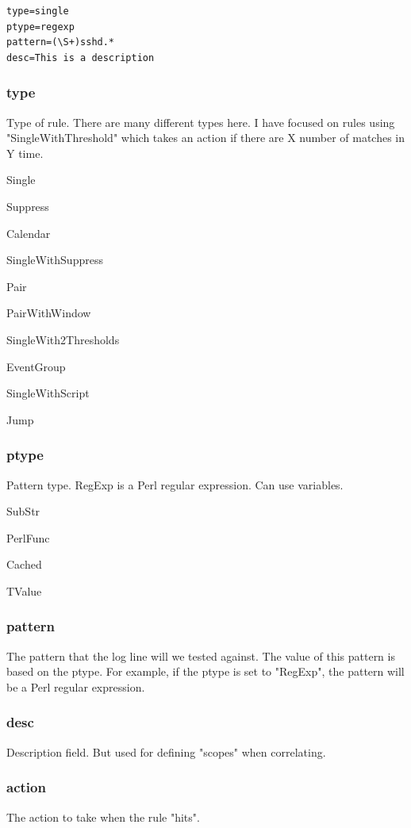 \begin{lstlisting}
type=single
ptype=regexp
pattern=(\S+)sshd.*
desc=This is a description
\end{lstlisting}

\subsubsection{type}
Type of rule. There are many different types here.
I have focused on rules using "SingleWithThreshold" which takes an action if there are X number of matches in Y time.

Single

Suppress

Calendar

SingleWithSuppress

Pair

PairWithWindow

SingleWith2Thresholds

EventGroup

SingleWithScript

Jump

\subsubsection{ptype}
Pattern type. RegExp is a Perl regular expression. Can use variables.

SubStr

PerlFunc

Cached

TValue

\subsubsection{pattern}
The pattern that the log line will we tested against. The value of this pattern is based on the ptype. For example, if the ptype is set to "RegExp", the pattern will be a Perl regular expression.

\subsubsection{desc}
Description field. But used for defining "scopes" when correlating.

\subsubsection{action}
The action to take when the rule "hits".

